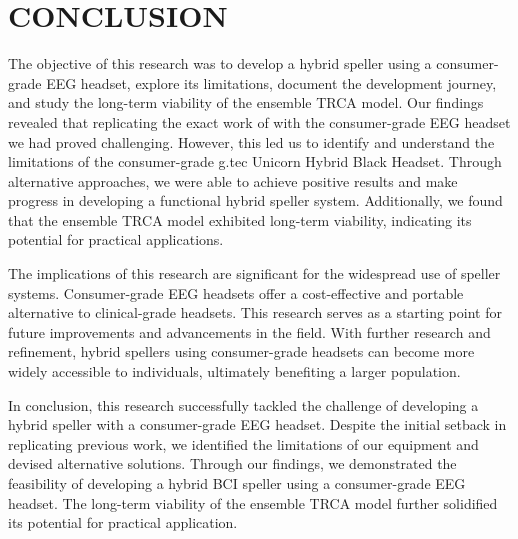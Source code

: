 \setlength{\footskip}{8mm}

\chapter{CONCLUSION}

The objective of this research was to develop a hybrid speller using a consumer-grade EEG headset, explore its limitations, document the development journey, and study the long-term viability of the ensemble TRCA model. Our findings revealed that replicating the exact work of \cite{xu2020implementing} with the consumer-grade EEG headset we had proved challenging. However, this led us to identify and understand the limitations of the consumer-grade g.tec Unicorn Hybrid Black Headset. Through alternative approaches, we were able to achieve positive results and make progress in developing a functional hybrid speller system. Additionally, we found that the ensemble TRCA model exhibited long-term viability, indicating its potential for practical applications.

The implications of this research are significant for the widespread use of speller systems. Consumer-grade EEG headsets offer a cost-effective and portable alternative to clinical-grade headsets. This research serves as a starting point for future improvements and advancements in the field. With further research and refinement, hybrid spellers using consumer-grade headsets can become more widely accessible to individuals, ultimately benefiting a larger population.

In conclusion, this research successfully tackled the challenge of developing a hybrid speller with a consumer-grade EEG headset. Despite the initial setback in replicating previous work, we identified the limitations of our equipment and devised alternative solutions. Through our findings, we demonstrated the feasibility of developing a hybrid BCI speller using a consumer-grade EEG headset. The long-term viability of the ensemble TRCA model further solidified its potential for practical application. 
